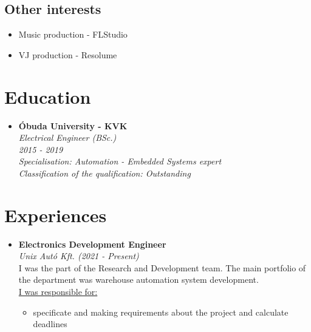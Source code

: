 \documentclass[11pt,oneslide,a4paper,titlepage]{article}
\begin{document}
\begin{tcolorbox}
\begin{minipage}[t]{8cm}
\begin{tcolorbox}[grow to left by=0.6cm,colback=gray!25,colframe=white]
			\section*{Other interests}
			\begin{itemize}
				\item{Music production - FLStudio}
				\item{VJ production - Resolume	}
			\end{itemize}													
		\end{tcolorbox}
	\end{minipage}
	\begin{minipage}[t]{11cm}
		\vspace*{-0.5cm}
		\begin{tcolorbox}[grow to right by=0.75cm,colframe=white,colback=white]
			\section*{Education}
			\begin{itemize}
				\item{
					\textbf{Óbuda University - KVK} \\
					\emph{Electrical Engineer (BSc.)} \\
					\emph{2015 - 2019} \\
					\emph{Specialisation: Automation - Embedded Systems expert} \\
					\emph{Classification of the qualification: Outstanding}
				}
			\end{itemize}
			\section*{Experiences}
			\begin{itemize}
				\item{
					\textbf{Electronics Development Engineer} \\	
					\emph{Unix Autó Kft. (2021 - Present)} \\
					\newline I was the part of the Research and Development team. The main portfolio of the department was warehouse automation system development. \\
					\newline \underline{I was responsible for:}
					\begin{itemize}
						\item{specificate and making requirements about the project and calculate deadlines}
						

\end{itemize}}
\end{itemize}
\end{tcolorbox}
\end{minipage}
\end{tcolorbox}
\end{document}
